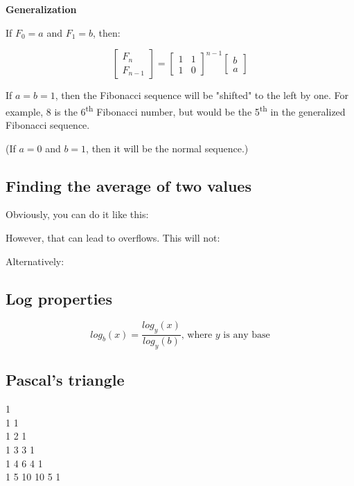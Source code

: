 \textbf{Generalization}

If $F_0 = a$ and $F_1 = b$, then:

\begin{equation*}
    \begin{bmatrix}
        F_n \\
        F_{n-1}
    \end{bmatrix}
    =
    \begin{bmatrix}
        1 & 1 \\
        1 & 0
    \end{bmatrix}
    ^{n-1}
    \begin{bmatrix}
        b \\
        a
    \end{bmatrix}
\end{equation*}

If $a = b = 1$, then the Fibonacci sequence will be "shifted" to the left by one. For example, 8 is the 6\textsuperscript{th} Fibonacci number, but would be the 5\textsuperscript{th} in the generalized Fibonacci sequence.

(If $a = 0$ and $b = 1$, then it will be the normal sequence.)

\subsection*{Finding the average of two values}

Obviously, you can do it like this: 

However, that can lead to overflows. This will not: 

Alternatively: 

\subsection*{Log properties}

$$log_b(x) = \frac{log_y(x)}{log_y(b)} \text{, where } y \text{ is any base}$$

\subsection*{Pascal's triangle}

\begin{center}
1 \\
1 1 \\
1 2 1 \\
1 3 3 1 \\
1 4 6 4 1 \\
1 5 10 10 5 1
\end{center}

